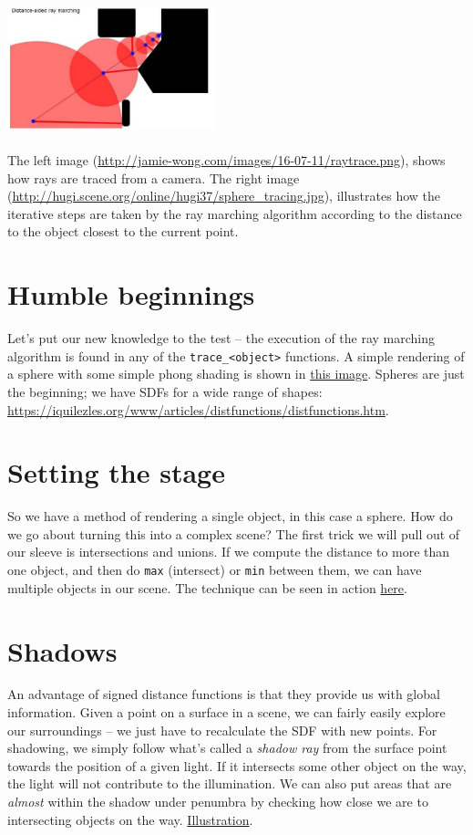 \documentclass[abstract=off,oneside]{scrreprt}
\begin{document}
\includegraphics[width=0.45\textwidth]{./img/sphere_tracing.jpg}
\\\\
The left image (\url{http://jamie-wong.com/images/16-07-11/raytrace.png}),
shows how rays are traced from a camera. The right image
(\url{http://hugi.scene.org/online/hugi37/sphere_tracing.jpg}), illustrates
how the iterative steps are taken by the ray marching algorithm
according to the distance to the object closest to the current point.

\section*{Humble beginnings}
\label{sec-4}
\label{sec:beginnings}
Let's put our new knowledge to the test -- the execution of the ray
marching algorithm is found in any of the \verb~trace_<object>~
functions. A simple rendering of a sphere with some simple phong
shading is shown in \hyperref[fig:simplesphere]{this image}. Spheres are just the beginning; we
have SDFs for a wide range of shapes:
\url{https://iquilezles.org/www/articles/distfunctions/distfunctions.htm}.

\section*{Setting the stage}
\label{sec-5}
\label{sec:creatingascene}
So we have a method of rendering a single object, in this case a
sphere. How do we go about turning this into a complex scene? The
first trick we will pull out of our sleeve is intersections and
unions. If we compute the distance to more than one object, and then
do \verb~max~ (intersect) or \verb~min~ between them, we can have multiple
objects in our scene. The technique can be seen in action \hyperref[fig:union]{here}.

\section*{Shadows}
\label{sec-6}
\label{sec:shadows}
An advantage of signed distance functions is that they provide us with
global information. Given a point on a surface in a scene, we can
fairly easily explore our surroundings -- we just have to recalculate
the SDF with new points. For shadowing, we simply follow what's called
a \emph{shadow ray} from the surface point towards the position of a given
light. If it intersects some other object on the way, the light will
not contribute to the illumination. We can also put areas that are
\emph{almost} within the shadow under penumbra by checking how close we are
to intersecting objects on the way. \hyperref[fig:penumbra]{Illustration}.
\end{document}
